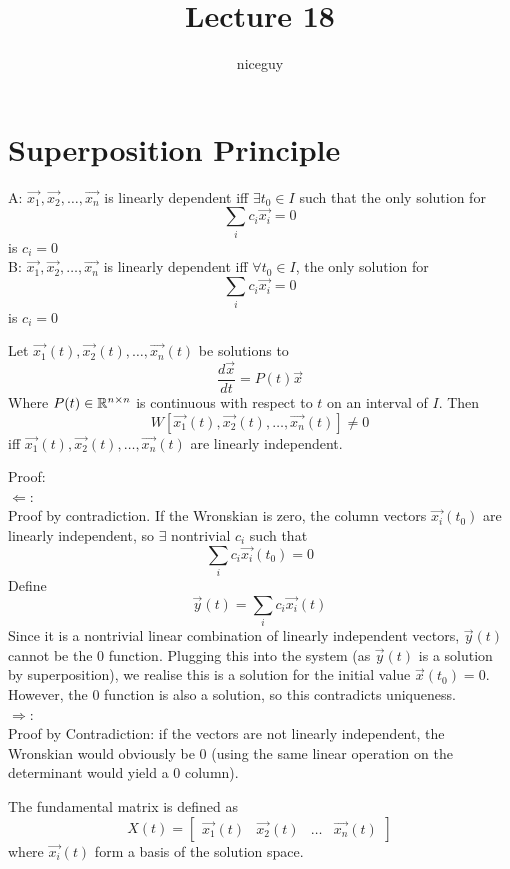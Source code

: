 \documentclass[12pt]{article}
\author{niceguy}
\title{Lecture 18}
\begin{document}
\maketitle

\section{Superposition Principle}

A: $\vec{x_1}, \vec{x_2}, \dots, \vec{x_n}$ is linearly dependent iff $\exists t_0\in I$ such that the only solution for
$$\sum_ic_i\vec{x_i} = 0$$
is $c_i = 0$ \\
B: $\vec{x_1}, \vec{x_2}, \dots, \vec{x_n}$ is linearly dependent iff $\forall t_0\in I$, the only solution for
$$\sum_ic_i\vec{x_i} = 0$$
is $c_i = 0$

\begin{thm}
	Let $\vec{x_1}(t), \vec{x_2}(t), \dots, \vec{x_n}(t)$ be solutions to
	$$\frac{d\vec{x}}{dt} = P(t)\vec{x}$$
	Where $P(t) \in \mathbb{R}^{n\times n}$ is continuous with respect to $t$ on an interval of $I$. Then
	$$W[\vec{x_1}(t),\vec{x_2}(t),\dots,\vec{x_n}(t)] \neq 0$$
	iff $\vec{x_1}(t), \vec{x_2}(t), \dots, \vec{x_n}(t)$ are linearly independent.
\end{thm}

Proof: \\
$\Leftarrow$: \\
Proof by contradiction. If the Wronskian is zero, the  column vectors $\vec{x_i}(t_0)$ are linearly independent, so $\exists$ nontrivial $c_i$ such that
$$\sum_i c_i\vec{x_i}(t_0) = 0$$
Define
$$\vec{y}(t) = \sum_i c_i\vec{x_i}(t)$$
Since it is a nontrivial linear combination of linearly independent vectors, $\vec{y}(t)$ cannot be the 0 function. Plugging this into the system (as $\vec{y}(t)$ is a solution by superposition), we realise this is a solution for the initial value $\vec{x}(t_0) = 0$. However, the 0 function is also a solution, so this contradicts uniqueness. \\
$\Rightarrow$: \\
Proof by Contradiction: if the vectors are not linearly independent, the Wronskian would obviously be 0 (using the same linear operation on the determinant would yield a 0 column).

\begin{defn}
	The fundamental matrix is defined as
	$$X(t) = \begin{bmatrix} \vec{x_1}(t) & \vec{x_2}(t) & \dots & \vec{x_n}(t)\end{bmatrix}$$
		where $\vec{x_i}(t)$ form a basis of the solution space.
\end{defn}
\end{document}
